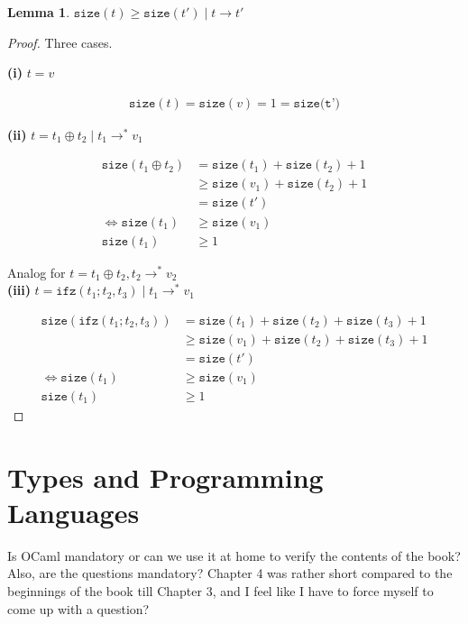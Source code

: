 \documentclass{article}
\newtheorem{lemma}{Lemma}
\begin{document}
\begin{lemma}
$\texttt{size}(t) \ge \texttt{size}(t') \mid t \rightarrow t'$
\end{lemma}

\begin{proof} Three cases.

\textbf{(i)} $t = v$

\begin{align}
\texttt{size}(t) = \texttt{size}(v) = 1 = \texttt{size(t')}
\end{align}

\textbf{(ii)} $t = t_1 \oplus t_2 \mid t_1 \rightarrow^* v_1$

\begin{align}
\texttt{size}(t_1 \oplus t_2) 
&= \texttt{size}(t_1) + \texttt{size}(t_2) + 1 \label{eq:case-2-1}\\
&\ge \texttt{size}(v_1) + \texttt{size}(t_2) + 1 \label{eq:case-2-2}\\
&= \texttt{size}(t')\\
\Leftrightarrow \texttt{size}(t_1) &\ge \texttt{size}(v_1) \\
\texttt{size}(t_1) &\ge 1
\end{align}

Analog for $t = t_1 \oplus t_2, t_2 \rightarrow^* v_2$ \\

\textbf{(iii)} $t = \texttt{ifz}(t_1; t_2, t_3) \mid t_1 \rightarrow^* v_1$

\begin{align}
\texttt{size}(\texttt{ifz}(t_1; t_2, t_3))
&= \texttt{size}(t_1) + \texttt{size}(t_2) + \texttt{size}(t_3) + 1 \\
&\ge \texttt{size}(v_1) + \texttt{size}(t_2) + \texttt{size}(t_3) + 1\\
&= \texttt{size}(t')\\
\Leftrightarrow \texttt{size}(t_1) &\ge \texttt{size}(v_1) \\
\texttt{size}(t_1) &\ge 1
\end{align}

\end{proof}

\section*{Types and Programming Languages}

Is OCaml mandatory or can we use it at home to verify the contents of the book? Also, are the questions mandatory? Chapter 4 was rather short compared to the beginnings of the book till Chapter 3, and I feel like I have to force myself to come up with a question?
\end{document}
